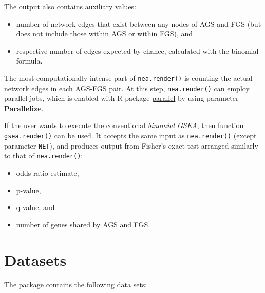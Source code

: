 \documentclass[]{article}
\providecommand{\tightlist}{%
  \setlength{\itemsep}{0pt}\setlength{\parskip}{0pt}}
\begin{document}
The output also contains auxiliary values:

\begin{itemize}
\tightlist
\item
  number of network edges that exist between any nodes of AGS and FGS
  (but does not include those within AGS or within FGS), and
\item
  respective number of edges expected by chance, calculated with the
  binomial formula.
\end{itemize}

The most computationally intense part of \texttt{nea.render()} is
counting the actual network edges in each AGS-FGS pair. At this step,
\texttt{nea.render()} can employ parallel jobs, which is enabled with R
package
\href{https://stat.ethz.ch/R-manual/R-devel/library/parallel/doc/parallel.pdf}{parallel}
by using parameter \textbf{Parallelize}.

If the user wants to execute the conventional \emph{binomial GSEA}, then
function \protect\hyperlink{gsea-run}{\texttt{gsea.render()}} can be
used. It accepts the same input as \texttt{nea.render()} (except
parameter \texttt{NET}), and produces output from Fisher's exact test
arranged similarly to that of \texttt{nea.render()}:

\begin{itemize}
\tightlist
\item
  odds ratio estimate,
\item
  p-value,
\item
  q-value, and
\item
  number of genes shared by AGS and FGS.
\end{itemize}

\hypertarget{test2}{\section{Datasets}\label{test2}}

The package contains the following data sets:
\end{document}
